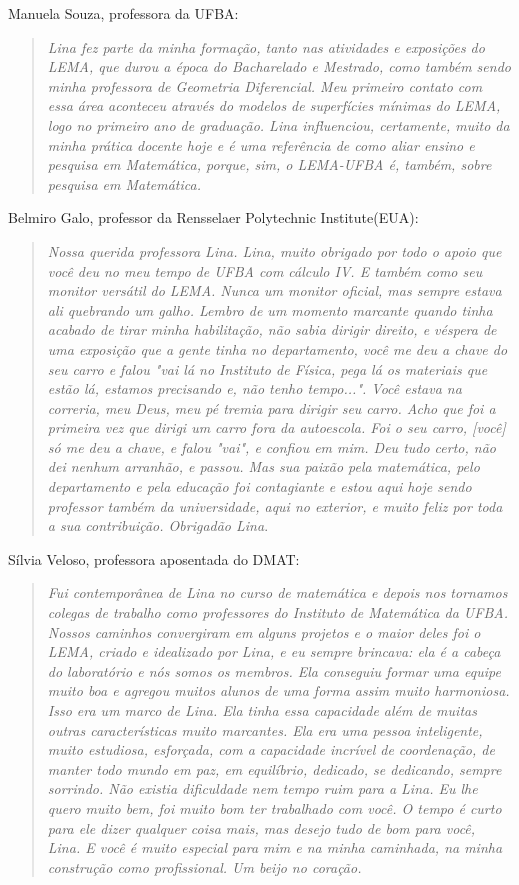 \documentclass{hipatia}
\begin{document}
Manuela Souza, professora da UFBA: \begin{quote} \textit{Lina fez parte da minha formação, tanto nas atividades e exposições do LEMA, que durou a época do Bacharelado e Mestrado, como também sendo minha professora de Geometria Diferencial. Meu primeiro contato com essa área aconteceu através do modelos de superfícies mínimas do LEMA, logo no primeiro ano de graduação. Lina influenciou, certamente, muito da minha prática docente hoje e é uma referência de como aliar ensino e pesquisa em Matemática, porque, sim, o LEMA-UFBA é, também, sobre pesquisa em Matemática.} \end{quote}

Belmiro Galo, professor da Rensselaer Polytechnic Institute(EUA): \begin{quote} \textit{Nossa querida professora Lina. Lina, muito obrigado por todo o apoio que você deu no meu tempo
de UFBA com cálculo IV. E também como seu monitor versátil do LEMA. Nunca um monitor oficial, mas
sempre estava ali quebrando um galho. Lembro de um momento marcante quando tinha acabado de tirar
minha habilitação, não sabia dirigir direito, e véspera de uma exposição que a gente tinha no
departamento, você me deu a chave do seu carro e falou "vai lá no Instituto de Física, pega lá os
materiais que estão lá, estamos precisando e, não tenho tempo...". Você estava na correria, meu Deus, meu pé tremia para dirigir seu carro. Acho que foi a primeira vez que dirigi um carro fora da autoescola. Foi o seu carro, [você] só me deu a chave, e falou "vai", e confiou em mim. Deu tudo certo, não dei nenhum arranhão, e passou. Mas sua paixão pela matemática, pelo departamento e pela educação foi contagiante e estou aqui hoje sendo professor também da universidade, aqui no exterior, e muito feliz por toda a sua contribuição. Obrigadão Lina}.\end{quote}

Sílvia Veloso, professora aposentada do DMAT: \begin{quote}
\textit{Fui contemporânea de Lina no curso de matemática e depois nos tornamos colegas de trabalho como
professores do Instituto de Matemática da UFBA. Nossos caminhos convergiram em alguns projetos e o maior deles foi o LEMA, criado e idealizado por
Lina, e eu sempre brincava: ela é a cabeça do laboratório e nós somos os membros. Ela conseguiu formar
uma equipe muito boa e agregou muitos alunos de uma forma assim muito harmoniosa.
Isso era um marco de Lina. Ela tinha essa capacidade além de muitas outras características muito
marcantes. Ela era uma pessoa inteligente, muito estudiosa, esforçada, com a capacidade incrível de
coordenação, de manter todo mundo em paz, em equilíbrio, dedicado, se dedicando, sempre sorrindo.
Não existia dificuldade nem tempo ruim para a Lina. Eu lhe quero muito bem, foi muito bom ter
trabalhado com você. O tempo é curto para ele dizer qualquer coisa mais, mas desejo tudo de bom para
você, Lina. E você é muito especial para mim e na minha caminhada, na minha construção como
profissional. Um beijo no coração.}
\end{quote} 
\end{document}

